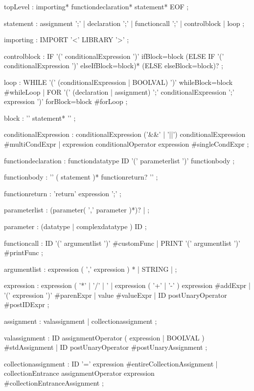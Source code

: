 topLevel
    : importing* functiondeclaration* statement* EOF
    ;

statement
    : assignment ';'
    | declaration ';'
    | functioncall ';'
    | controlblock
    | loop
    ;

importing
    : IMPORT '<' LIBRARY '>'
    ; 

controlblock
    : IF '(' conditionalExpression ')' ifBlock=block (ELSE IF '(' conditionalExpression ')' elseIfBlock=block)* (ELSE elseBlock=block)?
    ;

loop
    : WHILE '(' (conditionalExpression | BOOLVAL) ')' whileBlock=block      #whileLoop
    | FOR '(' (declaration | assignment) ';' conditionalExpression ';' expression ')' forBlock=block     #forLoop
    ;

block
    : '{' statement* '}'
    ;
    
conditionalExpression
    : conditionalExpression ('&&' | '||') conditionalExpression  #multiCondExpr
    | expression conditionalOperator expression                  #singleCondExpr
    ;

functiondeclaration
    : functiondatatype ID '(' parameterlist ')' functionbody
    ; 
    
functionbody
    : '{' ( statement )* functionreturn? '}'
    ;

functionreturn
    : 'return' expression ';'
    ;


parameterlist
    : (parameter( ',' parameter )*)?
    | 
    ;

parameter
    : (datatype | complexdatatype ) ID
    ;

functioncall
    : ID '(' argumentlist ')'          #customFunc
    | PRINT '(' argumentlist ')'       #printFunc
    ;

argumentlist
    : expression ( ',' expression ) *
    | STRING
    | 
    ;

expression
    : expression ( '*' | '/' | '%
    | expression ( '+' | '-' ) expression           #addExpr
    | '(' expression ')'                            #parenExpr
    | value                                         #valueExpr
    | ID postUnaryOperator                          #postIDExpr
    ;

assignment
    : valassignment
	| collectionassignment
    ;

valassignment
	: ID assignmentOperator ( expression | BOOLVAL ) #stdAssignment
    | ID postUnaryOperator                           #postUnaryAssignment
	;

collectionassignment
	: ID '=' expression                                 #entireCollectionAssignment
	| collectionEntrance assignmentOperator expression  #collectionEntranceAssignment
	;
	
